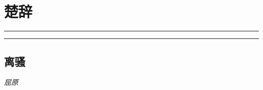 \documentclass[]{article}
\date{}
\begin{document}
\hypertarget{header-n0}{%
\section{楚辞}\label{header-n0}}

\begin{center}\rule{0.5\linewidth}{\linethickness}\end{center}

\tableofcontents

\begin{center}\rule{0.5\linewidth}{\linethickness}\end{center}

\hypertarget{header-n6}{%
\subsection{离骚}\label{header-n6}}

\emph{屈原}
\end{document}
